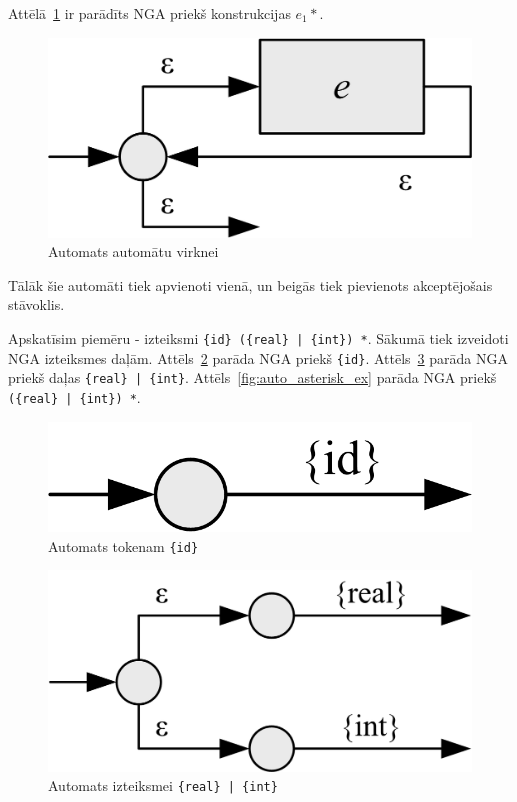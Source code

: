 Attēlā~\ref{fig:auto_asterisk} ir parādīts NGA priekš konstrukcijas $e_1 *$.
\begin{figure}[H]
  \centering
    \includegraphics[scale=1.5]{pictures/auto_asterisk}
  \caption{\label{fig:auto_asterisk}Automats automātu virknei}
\end{figure}

Tālāk šie automāti tiek apvienoti vienā, un beigās tiek pievienots akceptējošais stāvoklis.

Apskatīsim piemēru - izteiksmi \verb/{id} ({real} | {int}) */. Sākumā tiek izveidoti NGA izteiksmes daļām. Attēls~\ref{fig:auto_token_id} parāda NGA priekš \verb|{id}|. Attēls~\ref{fig:auto_or_ex} parāda NGA priekš daļas \verb/{real} | {int}/. Attēls~\ref{fig:auto_asterisk_ex} parāda NGA priekš \verb/({real} | {int}) */.

\begin{figure}[H]
  \centering
    \includegraphics[scale=1.5]{pictures/auto_token_id}
  \caption{\label{fig:auto_token_id}Automats tokenam \texttt{\{id\}}}
\end{figure}

\begin{figure}[H]
  \centering
    \includegraphics[scale=1.5]{pictures/auto_or_ex}
  \caption{\label{fig:auto_or_ex}Automats izteiksmei \texttt{\{real\} | \{int\}}}
\end{figure}

